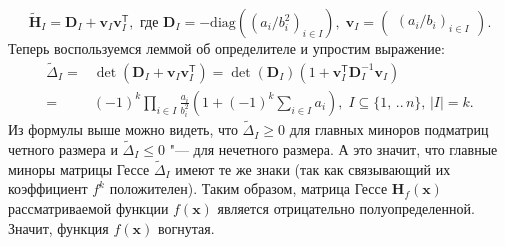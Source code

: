 \documentclass[a4paper,12pt]{article}
\begin{document}
\begin{enumerate}
\begin{enumerate}
			\begin{equation*}
				\tilde{\mathbf{H}}_I = \mathbf{D}_I + \mathbf{v}_I\mathbf{v}_I^\mathsf{T},\text{ где } \mathbf{D}_I = -\text{diag}((a_i/b_i^2)_{i\in I}),\; \mathbf{v}_I = \begin{pmatrix}
					(a_i/b_i)_{i\in I}
				\end{pmatrix}.			
			\end{equation*}
			Теперь воспользуемся леммой об определителе и упростим выражение:
			\begin{equation*}\begin{aligned}
				\tilde{\Delta}_I = & 
				\det(\mathbf{D}_I + \mathbf{v}_I\mathbf{v}_I^\mathsf{T}) = 
				\det(\mathbf{D}_I)(1 + \mathbf{v}_I^\mathsf{T} \mathbf{D}_I^{-1} \mathbf{v}_I) \\
				= & (-1)^k \prod_{i\in I} \frac{a_i}{b_i^2} \left( 1 + (-1)^k \sum_{i\in I} a_i \right),\; I\subseteq\{1,\,..\,n\},\, |I| = k.
			\end{aligned}\end{equation*}
			Из формулы выше можно видеть, что $\tilde{\Delta}_I \geqslant 0 $ для главных миноров подматриц четного размера и $\tilde{\Delta}_I \leqslant 0 $ "--- для нечетного размера. А это значит, что главные миноры матрицы Гессе $\tilde{\Delta}_I$ имеют те же знаки (так как связывающий их коэффициент $f^k$ положителен). Таким образом, матрица Гессе  $\mathbf{H}_f(\mathbf{x})$ рассматриваемой функции $f(\mathbf{x})$ является отрицательно полуопределенной. Значит, функция  $f(\mathbf{x})$ вогнутая.
			
			
		
			
			
			
%			
%			
			

\end{enumerate}
\end{enumerate}
\end{document}
